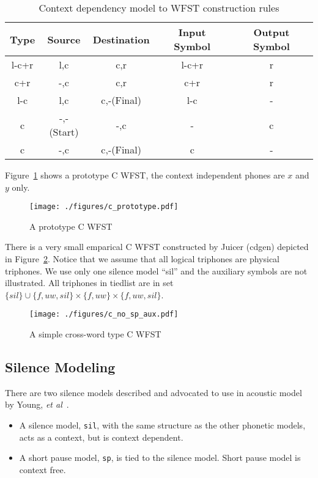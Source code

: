 \begin{table}[H]
\begin{center}
  \begin{tabular}{| c | c | c | c | c |}
  \hline
  Type & Source & Destination & Input Symbol & Output Symbol \\ \hline
  l-c+r & l,c & c,r & l-c+r & r \\ \hline
  c+r & -,c & c,r & c+r & r \\ \hline
  l-c & l,c & c,-(Final) & l-c & - \\ \hline
  c & -,-(Start) & -,c & - & c \\ \hline
  c & -,c & c,-(Final) & c & - \\ \hline
  \end{tabular}
  \caption{Context dependency model to WFST construction rules}
  \label{tbl:cdrules}
\end{center}
\end{table}

Figure~\ref{c_prototype} shows a prototype C WFST, the context independent phones are $x$ and $y$ only.

\begin{figure}[H]
  \centering
  \texttt{[image: ./figures/c\_prototype.pdf]}
  \caption{A prototype C WFST}
  \label{c_prototype}
\end{figure}

There is a very small emparical C WFST constructed by Juicer (cdgen) depicted in Figure~\ref{c_no_sp_aux}. Notice that we assume that all logical triphones are physical triphones. We use only one silence model ``sil'' and the auxiliary symbols are not illustrated. All triphones in tiedlist are in set $\{sil\}\cup\{f,uw,sil\}\times\{f,uw\}\times\{f,uw,sil\}$.

\begin{figure}[H]
  \centering
  \texttt{[image: ./figures/c\_no\_sp\_aux.pdf]}
  \caption{A simple cross-word type C WFST}
  \label{c_no_sp_aux}
\end{figure}

\subsection{Silence Modeling}
\label{silmod}
There are two silence models described and advocated to use in acoustic model by Young, \textit{et al}~\cite{young2006htk}. 

\begin{itemize}
\item
  A silence model, \texttt{sil}, with the same structure as the other phonetic models, acts as a context, but is context dependent.
\item
  A short pause model, \texttt{sp}, is tied to the silence model. Short pause model is context free.
\end{itemize}

